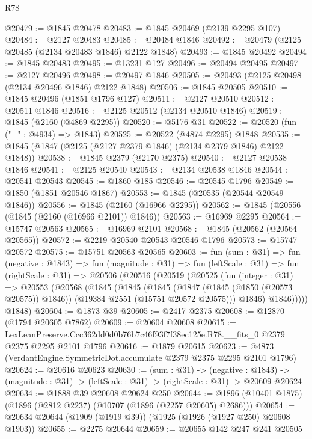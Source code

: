 \begin{lexlean}{R78}
\begin{coremodule}
@20479 := @1845 @20478
@20483 := @1845 @20469 (@2139 @2295 @107)
@20484 := @2127 @20483
@20485 := @20484 @1846
@20492 := @20479 (@2125 @20485 (@2134 @20483 @1846) @2122 @1848)
@20493 := @1845 @20492
@20494 := @1845 @20483
@20495 := @13231 @127
@20496 := @20494 @20495
@20497 := @2127 @20496
@20498 := @20497 @1846
@20505 := @20493 (@2125 @20498 (@2134 @20496 @1846) @2122 @1848)
@20506 := @1845 @20505
@20510 := @1845 @20496 (@1851 @1796 @127)
@20511 := @2127 @20510
@20512 := @20511 @1846
@20516 := @2125 @20512 (@2134 @20510 @1846)
@20519 := @1845 (@2160 (@4869 @2295))
@20520 := @5176 @31
@20522 := @20520 (fun ("_" : @4934) => @1843)
@20525 := @20522 (@4874 @2295) @1848
@20535 := @1845 (@1847 (@2125 (@2127 @2379 @1846) (@2134 @2379 @1846) @2122 @1848))
@20538 := @1845 @2379 (@2170 @2375)
@20540 := @2127 @20538 @1846
@20541 := @2125 @20540
@20543 := @2134 @20538 @1846
@20544 := @20541 @20543
@20545 := @1860 @185
@20546 := @20545 @1796
@20549 := @1850 (@1851 @20546 @1867)
@20553 := @1845 (@20535 (@20544 @20549 @1846))
@20556 := @1845 (@2160 (@16966 @2295))
@20562 := @1845 (@20556 (@1845 (@2160 (@16966 @2101)) @1846))
@20563 := @16969 @2295
@20564 := @15747 @20563
@20565 := @16969 @2101
@20568 := @1845 (@20562 (@20564 @20565))
@20572 := @2219 @20540 @20543 @20546 @1796
@20573 := @15747 @20572
@20575 := @15751 @20563 @20565
@20603 := fun (sum : @31) =>
  fun (negative : @1843) =>
  fun (magnitude : @31) =>
  fun (leftScale : @31) =>
  fun (rightScale : @31) =>
  @20506
    (@20516
      (@20519
        (@20525
          (fun (integer : @31) =>
          @20553
            (@20568
              (@1845
                (@1845
                  (@1845
                    (@1847 (@1845 (@1850 (@20573 @20575)) @1846))
                    (@19384 @2551 (@15751 @20572 @20575)))
                  @1846)
                @1846)))))
      @1848)
@20604 := @1873 @39
@20605 := @2417 @2375
@20608 := @12870 (@1794 @20605 @7862)
@20609 := @20604 @20608
@20615 := LexLeanPreserve.Ccc362dd0d0b76b7c46f93f7f38ec125e.R78.__fits_0
    @2379
    @2375
    @2295
    @2101
    @1796
@20616 := @1879 @20615
@20623 := @4873 (VerdantEngine.SymmetricDot.accumulate @2379 @2375 @2295 @2101 @1796)
@20624 := @20616 @20623
@20630 := (sum : @31) ->
  (negative : @1843) ->
  (magnitude : @31) -> (leftScale : @31) -> (rightScale : @31) -> @20609 @20624
@20634 := @1888 @39 @20608 @20624 @250
@20644 := @1896 (@10401 @1875) (@1896 (@2812 @2237) (@10707 (@1896 (@2257 @20605) @2686)))
@20654 := @20634 @20644 (@1909 (@1919 @39)) (@1925 (@1926 (@1927 @250) @20608 @1903))
@20655 := @2275 @20644
@20659 := @20655 @142 @247 @241 @20505

\end{coremodule}
\end{lexlean}
